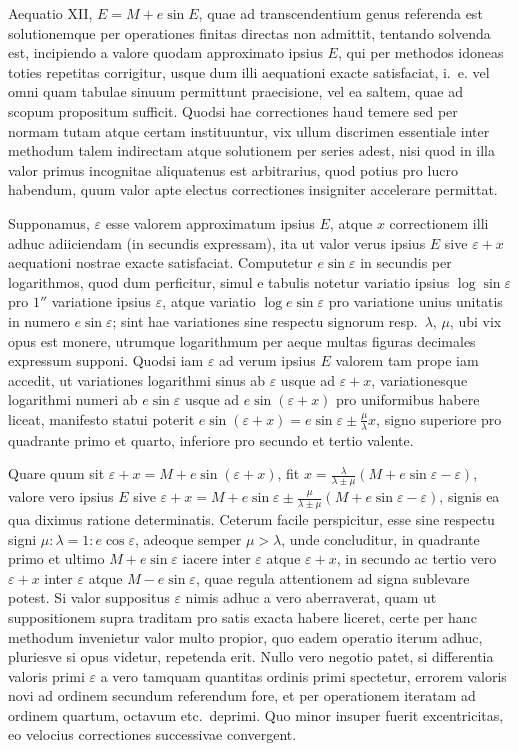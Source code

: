\documentclass[12pt,a4paper]{book}
\begin{document}
Aequatio XII, $E=M+e\sin E$, quae ad transcendentium genus referenda est solutionemque per operationes finitas directas non admittit, tentando solvenda est, incipiendo a valore quodam approximato ipsius $E$, qui per methodos idoneas toties repetitas corrigitur, usque dum illi aequationi exacte satisfaciat, i.~e. vel omni quam tabulae sinuum permittunt praecisione, vel ea saltem, quae ad scopum propositum sufficit. Quodsi hae correctiones haud temere sed per normam tutam atque certam instituuntur, vix ullum discrimen essentiale inter methodum talem indirectam atque solutionem per series adest, nisi quod in illa valor primus incognitae aliquatenus est arbitrarius, quod potius pro lucro habendum, quum valor apte electus correctiones insigniter accelerare permittat.

Supponamus, $\varepsilon$ esse valorem approximatum ipsius $E$, atque $x$ correctionem illi adhuc adiiciendam (in secundis expressam), ita ut valor verus ipsius $E$ sive $\varepsilon+x$ aequationi nostrae exacte satisfaciat. Computetur $e\sin\varepsilon$ in secundis per logarithmos, quod dum perficitur, simul e tabulis notetur variatio ipsius $\log\sin\varepsilon$ pro $1''$ variatione ipsius $\varepsilon$, atque variatio $\log e\sin\varepsilon$ pro variatione unius unitatis in numero $e\sin\varepsilon$; sint hae variationes sine respectu signorum resp.~$\lambda$, $\mu$, ubi vix opus est monere, utrumque logarithmum per aeque multas figuras decimales expressum supponi. Quodsi iam $\varepsilon$ ad verum ipsius $E$ valorem tam prope iam accedit, ut variationes logarithmi sinus ab $\varepsilon$ usque ad $\varepsilon+x$, variationesque logarithmi numeri ab $e\sin\varepsilon$ usque ad $e\sin(\varepsilon+x)$ pro uniformibus habere liceat, manifesto statui poterit $e\sin(\varepsilon+x)=e\sin\varepsilon\pm\frac{\mu}{\lambda}x$, signo superiore pro quadrante primo et quarto, inferiore pro secundo et tertio valente.

Quare quum sit $\varepsilon+x=M+e\sin(\varepsilon+x)$, fit $x=\frac{\lambda}{\lambda\pm\mu}(M+e\sin\varepsilon-\varepsilon)$, valore vero ipsius $E$ sive $\varepsilon+x=M+e\sin\varepsilon\pm\frac{\mu}{\lambda\pm\mu}(M+e\sin\varepsilon-\varepsilon)$, signis ea qua diximus ratione determinatis. Ceterum facile perspicitur, esse sine respectu signi $\mu:\lambda=1:e\cos\varepsilon$, adeoque semper $\mu>\lambda$, unde concluditur, in quadrante primo et ultimo $M+e\sin\varepsilon$ iacere inter $\varepsilon$ atque $\varepsilon+x$, in secundo ac tertio vero $\varepsilon+x$ inter $\varepsilon$ atque $M-e\sin\varepsilon$, quae regula attentionem ad signa sublevare potest. Si valor suppositus $\varepsilon$ nimis adhuc a vero aberraverat, quam ut suppositionem supra traditam pro satis exacta habere liceret, certe per hanc methodum invenietur valor multo propior, quo eadem operatio iterum adhuc, pluriesve si opus videtur, repetenda erit. Nullo vero negotio patet, si differentia valoris primi $\varepsilon$ a vero tamquam quantitas ordinis primi spectetur, errorem valoris novi ad ordinem secundum referendum fore, et per operationem iteratam ad ordinem quartum, octavum etc.~deprimi. Quo minor insuper fuerit excentricitas, eo velocius correctiones successivae convergent.
\end{document}

